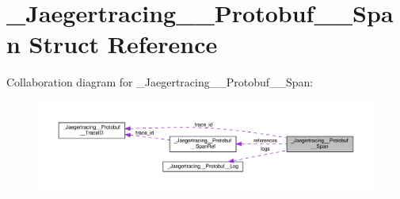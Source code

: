 \hypertarget{struct__Jaegertracing____Protobuf____Span}{}\section{\+\_\+\+Jaegertracing\+\_\+\+\_\+\+Protobuf\+\_\+\+\_\+\+Span Struct Reference}
\label{struct__Jaegertracing____Protobuf____Span}


Collaboration diagram for \+\_\+\+Jaegertracing\+\_\+\+\_\+\+Protobuf\+\_\+\+\_\+\+Span\+:
\nopagebreak
\begin{figure}[H]
\begin{center}
\leavevmode
\includegraphics[width=350pt]{struct__Jaegertracing____Protobuf____Span__coll__graph}
\end{center}
\end{figure}
